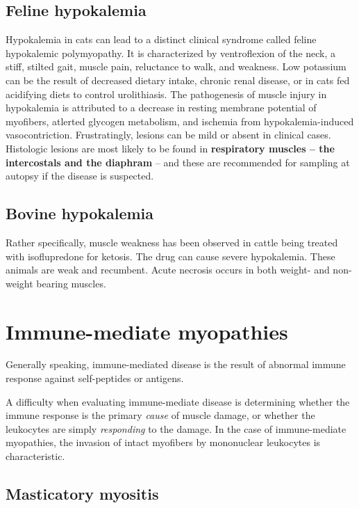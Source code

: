 \documentclass[openany]{report}
\begin{document}
\section{Feline hypokalemia}\label{feline-hypokalemia}

Hypokalemia in cats can lead to a distinct clinical syndrome called
feline hypokalemic polymyopathy. It is characterized by ventroflexion of
the neck, a stiff, stilted gait, muscle pain, reluctance to walk, and
weakness. Low potassium can be the result of decreased dietary intake,
chronic renal disease, or in cats fed acidifying diets to control
urolithiasis. The pathogenesis of muscle injury in hypokalemia is
attributed to a decrease in resting membrane potential of myofibers,
atlerted glycogen metabolism, and ischemia from hypokalemia-induced
vasocontriction. Frustratingly, lesions can be mild or absent in
clinical cases. Histologic lesions are most likely to be found in
\textbf{respiratory muscles -- the intercostals and the diaphram } --
and these are recommended for sampling at autopsy if the disease is
suspected.

\section{Bovine hypokalemia}\label{bovine-hypokalemia}

Rather specifically, muscle weakness has been observed in cattle being
treated with isoflupredone for ketosis. The drug can cause severe
hypokalemia. These animals are weak and recumbent. Acute necrosis occurs
in both weight- and non-weight bearing muscles.

\chapter{Immune-mediate myopathies}\label{immune-mediate-myopathies}

Generally speaking, immune-mediated disease is the result of abnormal
immune response against self-peptides or antigens.

A difficulty when evaluating immune-mediate disease is determining
whether the immune response is the primary \emph{cause} of muscle
damage, or whether the leukocytes are simply \emph{responding} to the
damage. In the case of immune-mediate myopathies, the invasion of intact
myofibers by mononuclear leukocytes is characteristic.

\section{Masticatory myositis}\label{masticatory-myositis}
\end{document}
